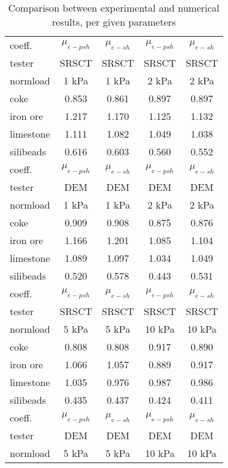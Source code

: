 \begin{table}[htbp]
  \centering
  \caption{Comparison between experimental and numerical results, per given parameters}
  \begin{tabular}{|lcccc|}
   \hline
    coeff. & $\mu_{e-psh}$ & $\mu_{e-sh}$ & $\mu_{e-psh}$ & $\mu_{e-sh}$ \\
    tester & SRSCT & SRSCT & SRSCT & SRSCT \\
    normload & 1 kPa & 1 kPa & 2 kPa & 2 kPa \\
	\hline
    coke  & 0.853 & 0.861 & 0.897 & 0.897 \\
    iron ore & 1.217 & 1.170 & 1.125 & 1.132 \\
    limestone &  1.111  & 1.082  & 1.049  & 1.038\\
    silibeads & 0.616 & 0.603 & 0.560 & 0.552 \\
 	\hline
	\hline
    coeff. & $\mu_{e-psh}$ & $\mu_{e-sh}$ & $\mu_{e-psh}$ & $\mu_{e-sh}$ \\
    tester & DEM   & DEM   & DEM   & DEM \\
    normload & 1 kPa & 1 kPa & 2 kPa & 2 kPa \\
	\hline
    coke  & 0.909 & 0.908 & 0.875 & 0.876 \\
    iron ore & 1.166 & 1.201 & 1.085 & 1.104 \\
    limestone & 1.089 & 1.097  &  1.034   & 1.049 \\
    silibeads & 0.520 & 0.578 & 0.443 & 0.531 \\
	\hline
	\hline
    coeff. & $\mu_{e-psh}$ & $\mu_{e-sh}$ & $\mu_{e-psh}$ & $\mu_{e-sh}$ \\
    tester & SRSCT & SRSCT & SRSCT & SRSCT \\
    normload & 5 kPa & 5 kPa & 10 kPa & 10 kPa \\
	\hline
    coke  & 0.808 & 0.808 & 0.917 & 0.890 \\
    iron ore & 1.066 & 1.057 & 0.889 & 0.917 \\
    limestone & 1.035 & 0.976 & 0.987 & 0.986 \\
    silibeads & 0.435 & 0.437 & 0.424 & 0.411 \\
	\hline
	\hline
    coeff. & $\mu_{e-psh}$ & $\mu_{e-sh}$ & $\mu_{e-psh}$ & $\mu_{e-sh}$ \\
    tester & DEM   & DEM   & DEM   & DEM \\
    normload & 5 kPa & 5 kPa & 10 kPa & 10 kPa \\

\end{tabular}
\end{table}
